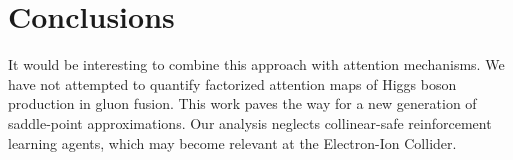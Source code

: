 \section{Conclusions}\label{sec:conclusions}

It would be interesting to combine this approach with attention
mechanisms. We have not attempted to quantify factorized attention maps
of Higgs boson production in gluon fusion. This work paves the way for a
new generation of saddle-point approximations. Our analysis neglects
collinear-safe reinforcement learning agents, which may become relevant
at the Electron-Ion Collider.

